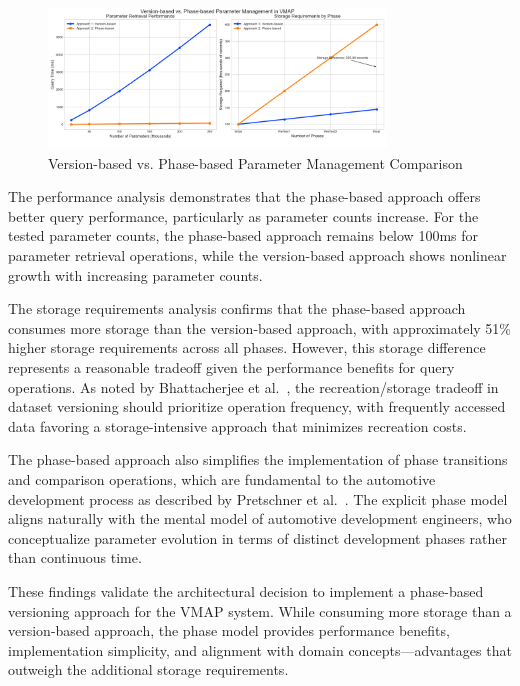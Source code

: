 \begin{figure}[h]
    \centering
    \includegraphics[width=0.8\textwidth]{figures/vmap_versioning_approaches_simplified.png}
    \caption{Version-based vs. Phase-based Parameter Management Comparison}
    \label{fig:versioning-approach-comparison}
\end{figure}

The performance analysis demonstrates that the phase-based approach offers better query performance, particularly as parameter counts increase. For the tested parameter counts, the phase-based approach remains below 100ms for parameter retrieval operations, while the version-based approach shows nonlinear growth with increasing parameter counts.

The storage requirements analysis confirms that the phase-based approach consumes more storage than the version-based approach, with approximately 51\% higher storage requirements across all phases. However, this storage difference represents a reasonable tradeoff given the performance benefits for query operations. As noted by Bhattacherjee et al.~\cite{bhattacherjee2015principles}, the recreation/storage tradeoff in dataset versioning should prioritize operation frequency, with frequently accessed data favoring a storage-intensive approach that minimizes recreation costs.

The phase-based approach also simplifies the implementation of phase transitions and comparison operations, which are fundamental to the automotive development process as described by Pretschner et al.~\cite{pretschner2007software}. The explicit phase model aligns naturally with the mental model of automotive development engineers, who conceptualize parameter evolution in terms of distinct development phases rather than continuous time.

These findings validate the architectural decision to implement a phase-based versioning approach for the VMAP system. While consuming more storage than a version-based approach, the phase model provides performance benefits, implementation simplicity, and alignment with domain concepts—advantages that outweigh the additional storage requirements.

